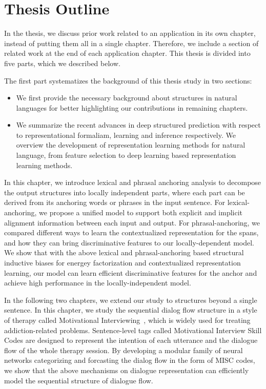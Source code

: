 
\section{Thesis Outline}
\label{sec:intro:roadmap}
In the thesis, we discuss prior work related to an application in its
own chapter, instead of putting them all in a single
chapter. Therefore, we include a section of related work at the end of
each application chapter. This thesis is divided into five parts,
which we described below.

 The first part systematizes the
background of this thesis study in two sections:
\begin{itemize}
\item {} We first provide the necessary
  background about structures in natural languages for better
  highlighting our contributions in remaining chapters.
\item {} We summarize
  the recent advances in deep structured prediction with respect to
  representational formaliam, learning and inference respectively. We
  overview the development of representation learning methods for
  natural language, from feature selection to deep learning based
  representation learning methods.
\end{itemize}

 In this chapter, we introduce lexical and phrasal
anchoring analysis to decompose the output structures into locally
independent parts, where each part can be derived from its anchoring
words or phrases in the input sentence. For lexical-anchoring, we
propose a unified model to support both explicit and implicit
alignment information between each input and output. For
phrasal-anchoring, we compared different ways to learn the
contextualized representation for the spans, and how they can bring
discriminative features to our locally-dependent model. We show that
with the above lexical and phrasal-anchoring based structural
inductive biases for energey factorization and contextualized
representation learning, our model can learn efficient discriminative
features for the anchor and achieve high performance in the
locally-independent model.

 In the following two chapters, we extend our study to
structures beyond a single sentence. In this chapter, we study the
sequential dialog flow structure in a style of therapy called
Motivational
Interviewing~\cite[MI,][]{miller2003motivational,miller2012motivational},
which is widely used for treating addiction-related problems.
Sentence-level tags called Motivational Interview Skill Codes are
designed to represent the intention of each utterance and the dialogue
flow of the whole therapy session. By developing a modular family of
neural networks categorizing and forcasting the dialog flow in the
form of MISC codes, we show that the above mechanisms on dialogue
representation can efficiently model the sequential structure of
dialogue flow.

